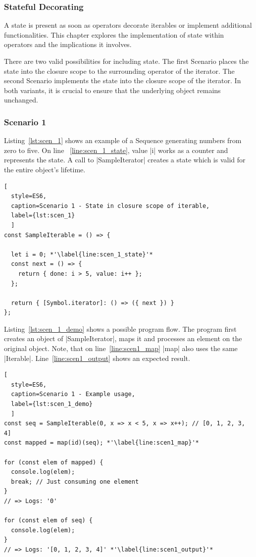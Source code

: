 \subsubsection{Stateful Decorating}
\label{subsub:Stateful Decorating}
A state is present as soon as operators decorate iterables or implement 
additional functionalities. This chapter explores the implementation of state
within operators and the implications it involves.

There are two valid possibilities for including state.
The first Scenario places the state into the closure scope to the surrounding 
operator of the iterator. The second Scenario implements the state into the 
closure scope of the iterator. In both variants, it is crucial to ensure that 
the underlying object remains unchanged.

\subsubsection{Scenario 1}
\label{subsub:Scenario 1}
Listing~\ref{lst:scen_1} shows an example of a Sequence generating numbers from
zero to five. On line ~\ref{line:scen_1_state}, value |i| works as a counter 
and represents the state. 
A call to |SampleIterator| creates a state which is valid for the entire 
object's lifetime.

\begin{lstlisting}[
  style=ES6, 
  caption=Scenario 1 - State in closure scope of iterable,
  label={lst:scen_1}
  ]
const SampleIterable = () => {

  let i = 0; *'\label{line:scen_1_state}'*
  const next = () => {
    return { done: i > 5, value: i++ };
  };

  return { [Symbol.iterator]: () => ({ next }) }
};
\end{lstlisting}

Listing~\ref{lst:scen_1_demo} shows a possible program flow. 
The program first creates an object of |SampleIterator|, maps it and processes
an element on the original object. Note, that on line~\ref{line:scen1_map} |map| also 
uses the same |Iterable|. Line~\ref{line:scen1_output} shows an expected result.

\begin{lstlisting}[
  style=ES6, 
  caption=Scenario 1 - Example usage,
  label={lst:scen_1_demo}
  ]
const seq = SampleIterable(0, x => x < 5, x => x++); // [0, 1, 2, 3, 4]
const mapped = map(id)(seq); *'\label{line:scen1_map}'*

for (const elem of mapped) {
  console.log(elem);
  break; // Just consuming one element
}
// => Logs: '0'

for (const elem of seq) {
  console.log(elem);
}
// => Logs: '[0, 1, 2, 3, 4]' *'\label{line:scen1_output}'*
\end{lstlisting}

